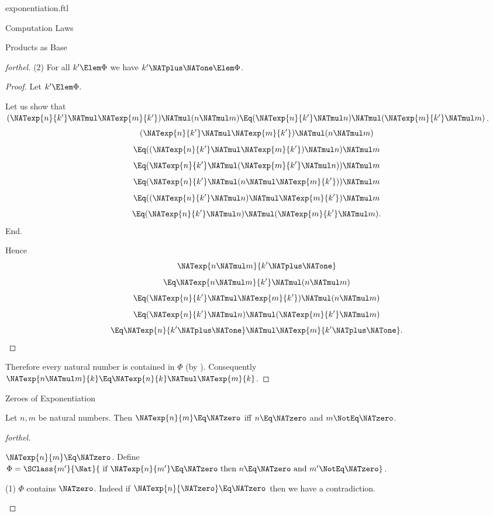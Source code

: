 \documentclass{stex}
\begin{document}
\begin{smodule}{exponentiation.ftl}
\begin{sfragment}{Computation Laws}
\begin{sfragment}{Products as Base}
\begin{proof}[forthel]
      (2) For all $k' \Elem \Phi$ we have $k' \NATplus \NATone \Elem \Phi$.
      \begin{proof}
        Let $k' \Elem \Phi$.

        Let us show that $(\NATexp{n}{k'} \NATmul \NATexp{m}{k'}) \NATmul (n \NATmul m) \Eq (\NATexp{n}{k'} \NATmul n) \NATmul (\NATexp{m}{k'} \NATmul m)$.
          \[  (\NATexp{n}{k'} \NATmul \NATexp{m}{k'}) \NATmul (n \NATmul m)       \]
          \[    \Eq ((\NATexp{n}{k'} \NATmul \NATexp{m}{k'}) \NATmul n) \NATmul m   \]
          \[    \Eq (\NATexp{n}{k'} \NATmul (\NATexp{m}{k'} \NATmul n)) \NATmul m   \]
          \[    \Eq (\NATexp{n}{k'} \NATmul (n \NATmul \NATexp{m}{k'})) \NATmul m   \]
          \[    \Eq ((\NATexp{n}{k'} \NATmul n) \NATmul \NATexp{m}{k'}) \NATmul m   \]
          \[    \Eq (\NATexp{n}{k'} \NATmul n) \NATmul (\NATexp{m}{k'} \NATmul m).  \]
        End.

        Hence
        \[  \NATexp{n \NATmul m}{k' \NATplus \NATone}                          \]
        \[    \Eq \NATexp{n \NATmul m}{k'} \NATmul (n \NATmul m)        \]
        \[    \Eq (\NATexp{n}{k'} \NATmul \NATexp{m}{k'}) \NATmul (n \NATmul m)   \]
        \[    \Eq (\NATexp{n}{k'} \NATmul n) \NATmul (\NATexp{m}{k'} \NATmul m)   \]
        \[    \Eq \NATexp{n}{k' \NATplus \NATone} \NATmul \NATexp{m}{k' \NATplus \NATone}.              \]
      \end{proof}

      Therefore every natural number is contained in $\Phi$ (by ).
      Consequently $\NATexp{n \NATmul m}{k} \Eq \NATexp{n}{k} \NATmul \NATexp{m}{k}$.
    \end{proof}
  \end{sfragment}

  \begin{sfragment}{Zeroes of Exponentiation}
    \begin{proposition}[forthel]
      Let $n, m$ be natural numbers.
      Then $\NATexp{n}{m} \Eq \NATzero$ iff $n \Eq \NATzero$ and $m \NotEq \NATzero$.
    \end{proposition}
    \begin{proof}[forthel]
      \begin{case}{$\NATexp{n}{m} \Eq \NATzero$.}
        Define $\Phi = \SClass{m'}{\Nat}{\text{ if }\NATexp{n}{m'} \Eq \NATzero\text{ then }n \Eq \NATzero\text{ and }m' \NotEq \NATzero}$.

        (1) $\Phi$ contains $\NATzero$.
        Indeed if $\NATexp{n}{\NATzero} \Eq \NATzero$ then we have a contradiction.


\end{case}
\end{proof}
\end{sfragment}
\end{sfragment}
\end{smodule}
\end{document}
